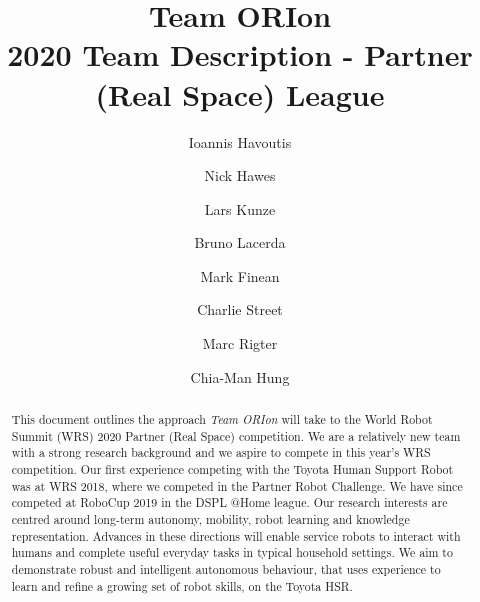 \documentclass[runningheads,a4paper]{llncs}
\newcommand{\teamori}{Team ORIon}
\begin{document}

\title{\teamori\\ 2020 Team Description - Partner (Real Space) League}

\author{Ioannis Havoutis \and Nick Hawes \and Lars Kunze \and Bruno Lacerda 
\and Mark Finean \and Charlie Street \and Marc Rigter \and Chia-Man Hung}

\maketitle


\begin{abstract}
This document outlines the approach \textit{\teamori} will take to the 
World Robot Summit (WRS) 2020 Partner (Real Space) competition. 
We are a relatively new team with a strong research background and we aspire to compete 
in this year's WRS competition. Our first experience competing with the Toyota Human 
Support Robot was at WRS 2018, where we competed in the Partner 
Robot Challenge. We have since competed at RoboCup 2019 in the DSPL @Home league.
Our research interests are centred around long-term
autonomy, mobility, robot learning and knowledge representation. 
Advances in these directions will enable service robots to interact with humans
and complete useful everyday tasks in typical household settings. 
We aim to demonstrate robust and intelligent autonomous behaviour, that uses
experience to learn and refine a growing set of robot skills, on the Toyota
HSR.
\end{abstract}


\end{document}
